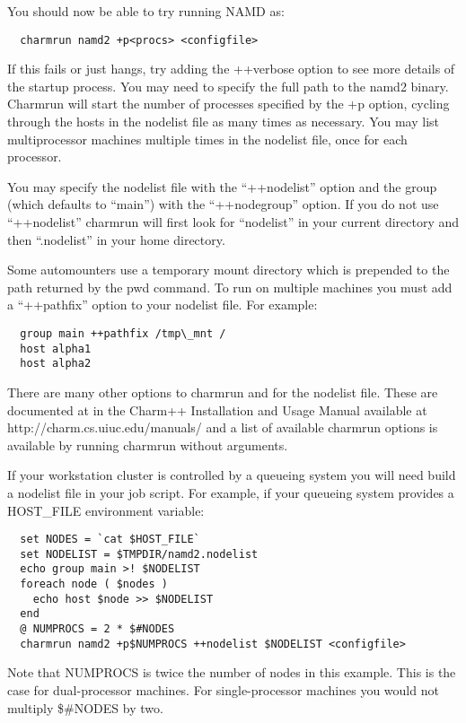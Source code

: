 You should now be able to try running NAMD as:

\begin{verbatim}
  charmrun namd2 +p<procs> <configfile>
\end{verbatim}

If this fails or just hangs, try adding the ++verbose option to see
more details of the startup process.  You may need to specify the full
path to the namd2 binary.  Charmrun will start the number of processes
specified by the +p option, cycling through the hosts in the nodelist
file as many times as necessary.  You may list multiprocessor machines
multiple times in the nodelist file, once for each processor.

You may specify the nodelist file with the ``++nodelist'' option and the
group (which defaults to ``main'') with the ``++nodegroup'' option.  If
you do not use ``++nodelist'' charmrun will first look for ``nodelist''
in your current directory and then ``.nodelist'' in your home directory.

Some automounters use a temporary mount directory which is prepended
to the path returned by the pwd command.  To run on multiple machines
you must add a ``++pathfix'' option to your nodelist file.  For example:

\begin{verbatim}
  group main ++pathfix /tmp\_mnt /
  host alpha1
  host alpha2
\end{verbatim}

There are many other options to charmrun and for the nodelist file.
These are documented at in the Charm++ Installation and Usage Manual
available at http://charm.cs.uiuc.edu/manuals/ and a list of available
charmrun options is available by running charmrun without arguments.

If your workstation cluster is controlled by a queueing system you
will need build a nodelist file in your job script.  For example, if
your queueing system provides a HOST\_FILE environment variable:

\begin{verbatim}
  set NODES = `cat $HOST_FILE`
  set NODELIST = $TMPDIR/namd2.nodelist
  echo group main >! $NODELIST
  foreach node ( $nodes )
    echo host $node >> $NODELIST
  end
  @ NUMPROCS = 2 * $#NODES
  charmrun namd2 +p$NUMPROCS ++nodelist $NODELIST <configfile>
\end{verbatim}

Note that NUMPROCS is twice the number of nodes in this example.
This is the case for dual-processor machines.  For single-processor
machines you would not multiply \$\#NODES by two.

